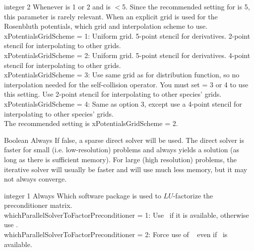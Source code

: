 \myhrule

{integer}
{2}
{Whenever  is 1 or 2 and  is $<$5.
Since the recommended setting for  is 5, this parameter is rarely relevant.}
{When an explicit grid is used for the Rosenbluth potentials, which grid and interpolation scheme to use.\\

{\ttfamily xPotentialsGridScheme} = 1: Uniform grid. 5-point stencil for derivatives. 2-point stencil for interpolating to other grids.\\

{\ttfamily xPotentialsGridScheme} = 2: Uniform grid. 5-point stencil for derivatives. 4-point stencil for interpolating to other grids.\\

{\ttfamily xPotentialsGridScheme} = 3: Use same grid as for distribution function, so no interpolation needed for the self-collision operator.
  You must set  = 3 or 4 to use this setting.  Use 2-point stencil for interpolating to other species' grids.\\

{\ttfamily xPotentialsGridScheme} = 4: Same as option 3, except use a 4-point stencil for interpolating to other species' grids.\\

The recommended setting is {\ttfamily xPotentialsGridScheme} = 2.}

\myhrule

{Boolean}
{\true}
{Always}
{If false, a sparse direct solver
will be used. The direct solver is faster for small (i.e. low-resolution) problems and always yields a solution
(as long as there is sufficient memory).
For large (high resolution) problems, the iterative solver will usually be faster and will use much
 less memory, but it may not always converge.
}

\myhrule

{integer}
{1}
{Always}
{Which software package is used to $LU$-factorize the preconditioner matrix.\\

{\ttfamily whichParallelSolverToFactorPreconditioner} = 1: Use \mumps~if it is available, otherwise use \superludist.\\

{\ttfamily whichParallelSolverToFactorPreconditioner} = 2: Force use of \superludist~ even if \mumps~is available.
}

